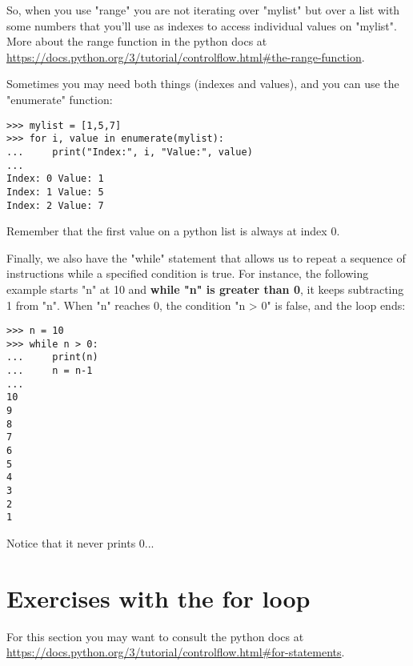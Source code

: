So, when you use "range" you are not iterating over "mylist" but over a list with some numbers that you'll use as indexes to access individual values on "mylist". More about the range function in the python docs at \url{https://docs.python.org/3/tutorial/controlflow.html#the-range-function}.

Sometimes you may need both things (indexes and values), and you can use the "enumerate" function:

\begin{lstlisting}
>>> mylist = [1,5,7]
>>> for i, value in enumerate(mylist):
...     print("Index:", i, "Value:", value)
... 
Index: 0 Value: 1
Index: 1 Value: 5
Index: 2 Value: 7
\end{lstlisting}

Remember that the first value on a python list is always at index 0. 

Finally, we also have the "while" statement that allows us to repeat a sequence of instructions while a specified condition is true. For instance, the following example starts "n" at 10 and \textbf{while "n" is greater than 0}, it keeps subtracting 1 from "n". When "n" reaches 0, the condition "n > 0" is false, and the loop ends:

\begin{lstlisting}
>>> n = 10
>>> while n > 0:
...     print(n)
...     n = n-1
... 
10
9
8
7
6
5
4
3
2
1
\end{lstlisting}

Notice that it never prints 0...

\section{Exercises with the for loop}

For this section you may want to consult the python docs at \url{https://docs.python.org/3/tutorial/controlflow.html#for-statements}.


